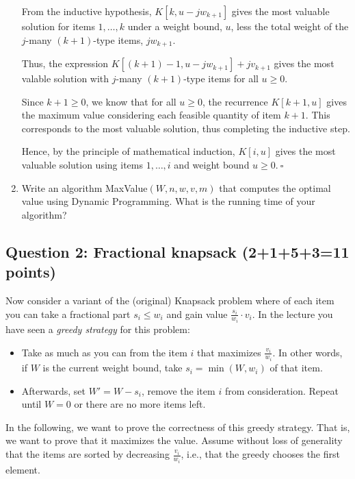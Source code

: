 \begin{enumerate}
\begin{solution}
From the inductive hypothesis, $K[k,u-jw_{k+1}]$ gives the most valuable solution for items $1,\dots,k$ under a weight bound, $u$, less the total weight of the $j$-many $(k+1)$-type items, $jw_{k+1}$.

Thus, the expression $K[(k+1)-1,u-jw_{k+1}]+jv_{k+1}$ gives the most valable solution with $j$-many $(k+1)$-type items for all $u\geq 0$.

Since $k+1\geq 0$, we know that for all $u\geq 0$, the recurrence $K[k+1,u]$ gives the maximum value considering each feasible quantity of item $k+1$. This corresponds to the most valuable solution, thus completing the inductive step.

Hence, by the principle of mathematical induction, $K[i,u]$ gives the most valuable solution using items $1,\dots,i$ and weight bound $u\geq 0$.$~\square$
\end{solution}
\item Write an algorithm {\sc MaxValue}$(W,n,w,v,m)$ that computes the optimal value using Dynamic Programming. What is the running time of your algorithm?

\begin{solution}

\end{solution}
\end{enumerate}
\subsection*{Question 2: Fractional knapsack (2+1+5+3=11 points)}

Now consider a variant of the (original) Knapsack problem where of each item you can take a fractional part $s_i \leq w_i$ and gain value $\frac{s_i}{w_i} \cdot v_i$.
In the lecture you have seen a \emph{greedy strategy} for this problem:
\begin{itemize}
    \item Take as much as you can from the item $i$ that maximizes $\frac{v_i}{w_i}$. In other words, if $W$ is the current weight bound, take $s_i=\min(W,w_i)$ of that item.
    \item Afterwards, set $W' = W-s_i$, remove the item $i$ from consideration. Repeat until $W=0$ or there are no more items left.
\end{itemize}
In the following, we want to prove the correctness of this greedy strategy. That is, we want to prove that it maximizes the value. Assume without loss of generality that the items are sorted by decreasing $\frac{v_i}{w_i}$, i.e., that the greedy chooses the first element.

